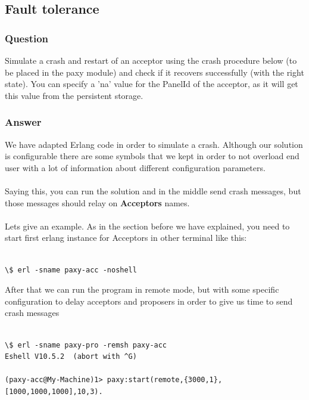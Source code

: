 \documentclass[a4paper, 10pt]{article}
\begin{document}
\subsection{Fault tolerance}
\subsubsection{Question}

Simulate a crash and restart of an acceptor using the crash procedure below (to be placed in the paxy module) and check if it recovers successfully (with the right state). You can specify a ’na’ value for the PanelId of the acceptor, as it will get this value from the persistent storage.

\subsubsection{Answer}

We have adapted Erlang code in order to simulate a crash. Although our solution
is configurable there are some symbols that we kept in order to not overload end
user with a lot of information about different configuration parameters.\\\\

Saying this, you can run the solution and in the middle send crash messages, but those messages should relay on \textbf{Acceptors} names.\\\\

Lets give an example. As in the section before we have explained, you need to start first erlang instance for Acceptors in other terminal like this:\\\\

\begin{lstlisting}
\$ erl -sname paxy-acc -noshell   
\end{lstlisting}
After that we can run the program in remote mode, but with some specific
configuration to delay acceptors and proposers in order to give us time to send crash messages\\\\

\begin{lstlisting}
\$ erl -sname paxy-pro -remsh paxy-acc
Eshell V10.5.2  (abort with ^G)
        
(paxy-acc@My-Machine)1> paxy:start(remote,{3000,1},[1000,1000,1000],10,3).
\end{lstlisting}
\end{document}

